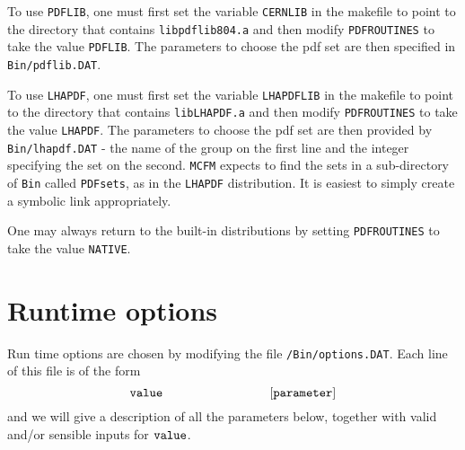 \documentclass[12pt]{article}
\begin{document}
To use {\tt PDFLIB}, one must first set the variable {\tt CERNLIB}
in the makefile to point to the directory that contains
{\tt libpdflib804.a} and then modify {\tt PDFROUTINES} to
take the value {\tt PDFLIB}. The parameters to choose the
pdf set are then specified in {\tt Bin/pdflib.DAT}.

To use {\tt LHAPDF}, one must first set the variable {\tt LHAPDFLIB}
in the makefile to point to the directory that contains
{\tt libLHAPDF.a} and then modify {\tt PDFROUTINES} to
take the value {\tt LHAPDF}. The parameters to choose the
pdf set are then provided by {\tt Bin/lhapdf.DAT} - the name of the group 
on the first line and the integer specifying the set on the second.
{\tt MCFM} expects to find the sets in a sub-directory of {\tt Bin} called
{\tt PDFsets}, as in the {\tt LHAPDF} distribution. It is easiest to
simply create a symbolic link appropriately.

One may always return to the built-in distributions by setting
{\tt PDFROUTINES} to take the value {\tt NATIVE}.

\section{Runtime options}
Run time options are chosen by modifying the file 
{\tt /Bin/options.DAT}. Each line of this file is of the form
\begin{displaymath}
{\tt value} \hspace{3cm} [{\tt parameter}]
\end{displaymath}
and we will give a description of all the parameters below, together with
valid and/or sensible inputs for ${\tt value}$.
\end{document}
